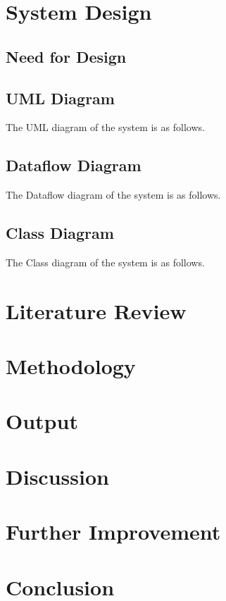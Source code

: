 \documentclass[a4paper,12pt,onepage]{article}
\begin{document}
\newpage
\section{System Design}
\subsection{Need for Design}

\newpage
\subsection{UML Diagram}
The UML diagram of the system is as follows.

\newpage
\subsection{Dataflow Diagram}
The Dataflow diagram of the system is as follows.

\newpage
\subsection{Class Diagram}\par
The Class diagram of the system is as follows.

\newpage
\section{Literature Review} 

\newpage
\section{Methodology}

\newpage
\section{Output}

\section{Discussion}

\newpage
\section{Further Improvement}

\newpage
\section{Conclusion}

\newpage


\nocite{*}
\end{document}
